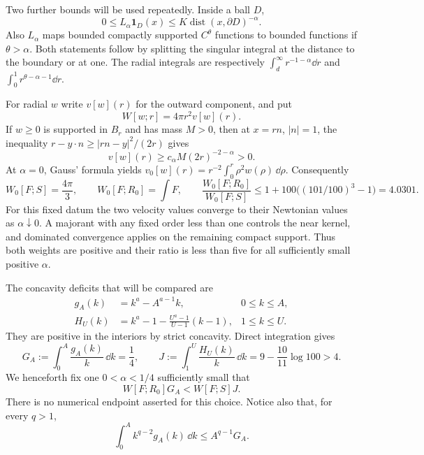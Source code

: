 Two further bounds will be used repeatedly. Inside a ball $D$,
\begin{equation}\label{eq:indicator}
 0\leq L_\alpha\mathbf1_D(x)\leq K\operatorname{dist}(x,\partial D)^{-\alpha}.
\end{equation}
Also $L_\alpha$ maps bounded compactly supported $C^\theta$ functions to
bounded functions if $\theta>\alpha$. Both statements follow by splitting
the singular integral at the distance to the boundary or at one. The
radial integrals are respectively $\int_d^\infty r^{-1-\alpha}\dd r$ and
$\int_0^1r^{\theta-\alpha-1}\dd r$.

For radial $w$ write $v[w](r)$ for the outward component, and put
\[
 W[w;r]=4\pi r^2v[w](r).
\]
If $w\geq0$ is supported in $B_r$ and has mass $M>0$, then at $x=rn$,
$|n|=1$, the inequality $r-y\cdot n\geq |rn-y|^2/(2r)$ gives
\begin{equation}\label{eq:boundary-positive}
 v[w](r)\geq c_\alpha M(2r)^{-2-\alpha}>0.
\end{equation}
At $\alpha=0$, Gauss' formula yields
$v_0[w](r)=r^{-2}\int_0^r\rho^2w(\rho)\,\dd\rho$.
Consequently
\[
 W_0[F;S]=\frac{4\pi}3,\qquad W_0[F;R_0]=\int F,
 \qquad
 \frac{W_0[F;R_0]}{W_0[F;S]}
 \leq1+100\bigl((101/100)^3-1\bigr)=4.0301.
\]
For this fixed datum the two velocity values converge to their Newtonian
values as $\alpha\downarrow0$. A majorant with any fixed order less than
one controls the near kernel, and dominated convergence applies on the
remaining compact support. Thus both weights are positive and their ratio
is less than five for all sufficiently small positive $\alpha$.

The concavity deficits that will be compared are
\begin{align}
 g_A(k)&=k^a-A^{a-1}k, &0\leq k\leq A,\\
 H_U(k)&=k^a-1-\frac{U^a-1}{U-1}(k-1), &1\leq k\leq U.
\end{align}
They are positive in the interiors by strict concavity. Direct integration gives
\begin{equation}\label{eq:margin}
 G_A:=\int_0^A\frac{g_A(k)}k\,\dd k=\frac14,
 \qquad J:=\int_1^U\frac{H_U(k)}k\,\dd k
 =9-\frac{10}{11}\log100>4.
\end{equation}
We henceforth fix one $0<\alpha<1/4$ sufficiently small that
\begin{equation}\label{eq:strict-margin}
 W[F;R_0]G_A<W[F;S]J.
\end{equation}
There is no numerical endpoint asserted for this choice. Notice also that,
for every $q>1$,
\begin{equation}\label{eq:density-cost}
 \int_0^A k^{q-2}g_A(k)\,\dd k\leq A^{q-1}G_A.
\end{equation}


